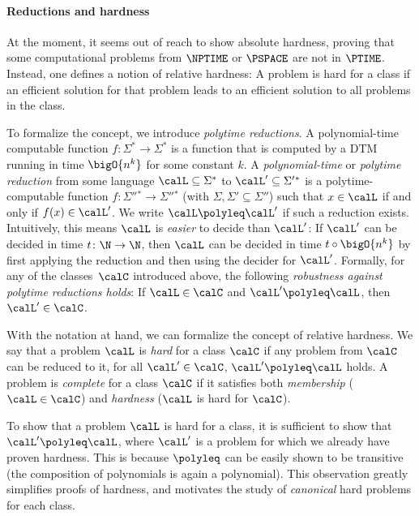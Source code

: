 \documentclass[../../diss.tex]{subfiles}
\begin{document}
\paragraph{Reductions and hardness}

At the moment, it seems out of reach to show absolute hardness, \ie proving that some computational problems from $\NPTIME$ or $\PSPACE$ are not in $\PTIME$.
Instead, one defines a notion of relative hardness:
A problem is hard for a class if an efficient solution for that problem leads to an efficient solution to all problems in the class.

To formalize the concept, we introduce \emph{polytime reductions}.
A polynomial-time computable function $f \colon \Sigma^* \to \Sigma^*$ is a function that is computed by a DTM running in time $\bigO{n^k}$ for some constant $k$.
A \emph{polynomial-time} or \emph{polytime reduction} from some language $\calL \subseteq \Sigma^*$ to $\calL' \subseteq \Sigma'{}^*$ is a polytime-computable function $f \colon \Sigma''{}^* \to \Sigma''{}^*$ (with $\Sigma, \Sigma' \subseteq \Sigma''$) such that $x \in \calL$ if and only if $f(x) \in \calL'$.
We write $\calL \polyleq \calL'$ if such a reduction exists.
Intuitively, this means $\calL$ is \emph{easier} to decide than $\calL'$:
If $\calL'$ can be decided in time $t \colon \N \to \N$, then $\calL$ can be decided in time $t \circ \bigO{n^k}$ by first applying the reduction and then using the decider for $\calL'$.
Formally, for any of the classes~$\calC$ introduced above, the following \emph{robustness against polytime reductions holds}:
If $\calL \in \calC$ and $\calL' \polyleq \calL$, then $\calL' \in \calC$.

With the notation at hand, we can formalize the concept of relative hardness.
We say that a problem $\calL$ is \emph{hard} for a class $\calC$ if any problem from $\calC$ can be reduced to it, \ie for all $\calL' \in \calC$, $\calL' \polyleq \calL$ holds.
A problem is \emph{complete} for a class $\calC$ if it satisfies both \emph{membership} ($\calL \in \calC$) and \emph{hardness} ($\calL$ is hard for $\calC$).

To show that a problem $\calL$ is hard for a class, it is sufficient to show that $\calL' \polyleq \calL$, where $\calL'$ is a problem for which we already have proven hardness.
This is because $\polyleq$ can be easily shown to be transitive (the composition of polynomials is again a polynomial).
This observation greatly simplifies proofs of hardness, and motivates the study of \emph{canonical} hard problems for each class.
\end{document}
